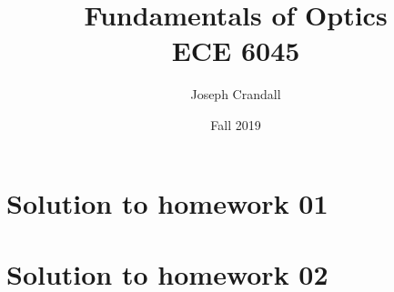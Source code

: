 

\usepackage{subfiles}
\usepackage{color,soul}
\usepackage{siunitx}

\title{Fundamentals of Optics\\
\large ECE 6045}
\author{Joseph Crandall}
\date{Fall 2019}


\maketitle

\section{Solution to homework 01}


\section{Solution to homework 02}


%

%

%


%


